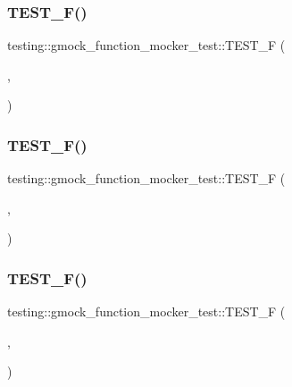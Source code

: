 \subsubsection{\texorpdfstring{TEST\_F()}{TEST\_F()}\hspace{0.1cm}{\footnotesize\ttfamily [4/13]}}
{\footnotesize\ttfamily testing\+::gmock\+\_\+function\+\_\+mocker\+\_\+test\+::\+T\+E\+S\+T\+\_\+F (\begin{DoxyParamCaption}\item[{\mbox{\hyperlink{classtesting_1_1gmock__function__mocker__test_1_1_mock_method_function_mocker_test}{Mock\+Method\+Function\+Mocker\+Test}}}]{,  }\item[{Mocks\+Binary\+Function}]{ }\end{DoxyParamCaption})}

\mbox{\label{namespacetesting_1_1gmock__function__mocker__test_a7b51041faea5674afd2651cc0eab7a17}} 
\subsubsection{\texorpdfstring{TEST\_F()}{TEST\_F()}\hspace{0.1cm}{\footnotesize\ttfamily [5/13]}}
{\footnotesize\ttfamily testing\+::gmock\+\_\+function\+\_\+mocker\+\_\+test\+::\+T\+E\+S\+T\+\_\+F (\begin{DoxyParamCaption}\item[{\mbox{\hyperlink{classtesting_1_1gmock__function__mocker__test_1_1_mock_method_function_mocker_test}{Mock\+Method\+Function\+Mocker\+Test}}}]{,  }\item[{Mocks\+Decimal\+Function}]{ }\end{DoxyParamCaption})}

\mbox{\label{namespacetesting_1_1gmock__function__mocker__test_a0211ece323793b32efe40c05d876e1f8}} 
\subsubsection{\texorpdfstring{TEST\_F()}{TEST\_F()}\hspace{0.1cm}{\footnotesize\ttfamily [6/13]}}
{\footnotesize\ttfamily testing\+::gmock\+\_\+function\+\_\+mocker\+\_\+test\+::\+T\+E\+S\+T\+\_\+F (\begin{DoxyParamCaption}\item[{\mbox{\hyperlink{classtesting_1_1gmock__function__mocker__test_1_1_mock_method_function_mocker_test}{Mock\+Method\+Function\+Mocker\+Test}}}]{,  }\item[{Mocks\+Function\+With\+Non\+Const\+Reference\+Argument}]{ }\end{DoxyParamCaption})}

